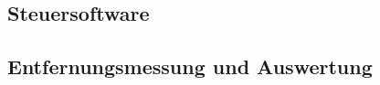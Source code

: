 \begin{comment}
------------------------------------------------------------------------------------------
\end{comment}
\subsection{Steuersoftware}

\begin{comment}

Zusätzlich werden Erfahrungsberichte aus dem Internet ausgewertet um die Beschaltung weiter zu verfeinern, siehe \cite{Trojer2015, Holder2016, Holder2016a}.
	
\subsection{Steuersoftware}
	- Klassendiagramme der wichtigsten Elemente
	- Basisscript
	- Ranging (Verfahren)
	- Datenaustausch zwischen Host und µC
\subsection{Entfernungsmessung und Auswertung}
	- Versuchsaufbau
	-
\subsection{Kalibierung}
	- Kalibierung nach DecaWave
		- FlowCharts erklären
		- Ergebnisse auswerten
	- Wo liegen die Problem
	- Script im Anhang
\end{comment}


\begin{comment}
------------------------------------------------------------------------------------------
\end{comment}
\subsection{Entfernungsmessung und Auswertung}

\begin{comment}
- Mit welchen Einstellungen kommt man auf die Entfernungsmessung?
- Streuung?
- LOS/NLOS {Holz, Bücher, Menschlicher Körper}
	- Welcher Fehler ergibt zwischen LOS/NLOS?
- Wie verändert sich die Genauigkeit der Entfernungsmessung bei einer direkten Sichtverbindung (engl. Line--of--sight (LOS)) und indirekten Sichtverbindung (engl. Non--line--of--sight (NLOS))?
\end{comment}

